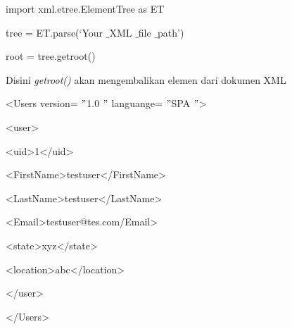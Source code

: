 \noindent 
{\fontsize{10pt}{10pt}\selectfont import xml.etree.ElementTree as ET} \par
\noindent 
{\fontsize{10pt}{10pt}\selectfont tree = ET.parse(‘Your $  \_  $XML $  \_  $file $  \_  $path’)} \par
\noindent 
{\fontsize{10pt}{10pt}\selectfont root = tree.getroot()} \par
\noindent 
{\fontsize{10pt}{10pt}\selectfont 



\newpage

}\vspace{10pt}
\vspace{10pt}
\noindent 
Disini \textit{getroot()} akan mengembalikan elemen dari dokumen XML \par
\vspace{10pt}
\noindent 
{\fontsize{10pt}{10pt}\selectfont <Users version= $ " $1.0 $ " $ languange= $ " $SPA $ " $>} \par
\noindent 
{\fontsize{10pt}{10pt}\selectfont  \hspace*{0.5in} <user>} \par
\noindent 
{\fontsize{10pt}{10pt}\selectfont  \hspace*{0.5in}  \hspace*{0.5in} <uid>1</uid>} \par
\noindent 
{\fontsize{10pt}{10pt}\selectfont  \hspace*{0.5in}  \hspace*{0.5in} <FirstName>testuser</FirstName>} \par
\noindent 
{\fontsize{10pt}{10pt}\selectfont  \hspace*{0.5in}  \hspace*{0.5in} <LastName>testuser</LastName>} \par
\noindent 
{\fontsize{10pt}{10pt}\selectfont  \hspace*{0.5in}  \hspace*{0.5in} <Email>testuser@tes.com/Email>} \par
\noindent 
{\fontsize{10pt}{10pt}\selectfont  \hspace*{0.5in}  \hspace*{0.5in} <state>xyz</state>} \par
\noindent 
{\fontsize{10pt}{10pt}\selectfont  \hspace*{0.5in}  \hspace*{0.5in} <location>abc</location>} \par
\noindent 
{\fontsize{10pt}{10pt}\selectfont  \hspace*{0.5in} </user>} \par
\noindent 
{\fontsize{10pt}{10pt}\selectfont </Users>} \par
\vspace{12pt}
